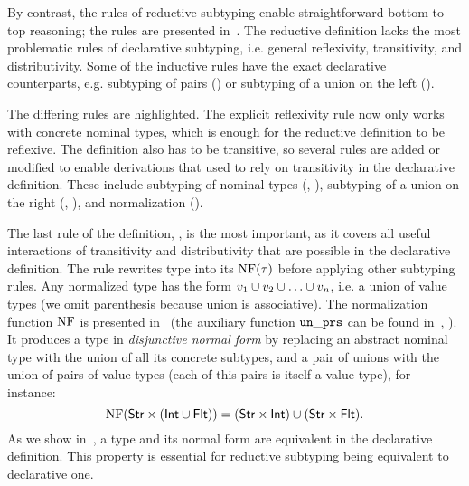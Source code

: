 By contrast, the rules of reductive subtyping enable
straightforward bottom-to-top reasoning;
the rules are presented in~.
The reductive definition lacks the most problematic rules
of declarative subtyping, 
i.e. general reflexivity, transitivity, and distributivity.
Some of the inductive rules have the exact declarative counterparts,
e.g. subtyping of pairs () or
subtyping of a union on the left ().

The differing rules are \colorbox{light-gray}{highlighted}.
The explicit reflexivity rule  now only works with 
concrete nominal types, which is enough 
for the reductive definition to be reflexive.
The definition also has to be transitive,
so several rules are added or modified to enable derivations
that used to rely on transitivity in the declarative definition.
These include subtyping of nominal types (, ),
subtyping of a union on the right (, ),
and normalization ().

The last rule of the definition, , is the most important,
as it covers all useful interactions of transitivity and distributivity 
that are possible in the declarative definition.
The rule rewrites type \ty into its  $\mathop{\mathrm{NF}}(\tau)$
before applying other subtyping rules.
Any normalized type has the form $v_1 \cup v_2 \cup \ldots \cup v_n$,
i.e. a union of value types
(we omit parenthesis because union is associative).
The normalization function $\mathop{\mathrm{NF}}$ is presented in~
(the auxiliary function $\mathop{\mathtt{un\_prs}}$ 
can be found in~, ).
It produces a type in \emph{disjunctive normal form}
by replacing an abstract nominal type 
with the union of all its concrete subtypes, 
and a pair of unions with the union of pairs of value types
(each of this pairs is itself a value type),
for instance:
\[
\mathop{\mathrm{NF}}(\mathsf{Str} \times (\mathsf{Int} \cup \mathsf{Flt})) =
(\mathsf{Str} \times \mathsf{Int}) \cup (\mathsf{Str} \times \mathsf{Flt}).
\]
As we show in~, a type and its normal form are
equivalent in the declarative definition.
This property is essential for reductive subtyping 
being equivalent to declarative one.

